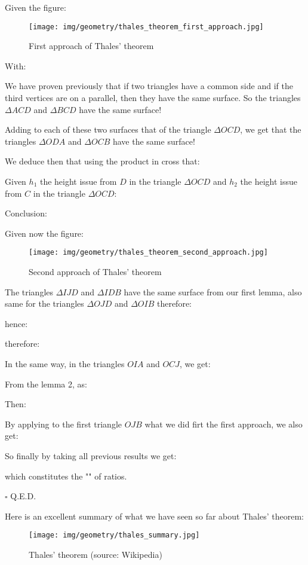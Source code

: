 	\begin{dem}
	Given the figure:
	\begin{figure}[H]
		\centering
		\texttt{[image: img/geometry/thales\_theorem\_first\_approach.jpg]}
		\caption{First approach of Thales' theorem}
	\end{figure}
	With:
	
	We have proven previously that if two triangles have a common side and if the third vertices are on a parallel, then they have the same surface. So the triangles $\Delta ACD$ and $\Delta BCD$ have the same surface!

	Adding to each of these two surfaces that of the triangle $\Delta OCD$, we get that the triangles $\Delta ODA$ and $\Delta OCB$ have the same surface!

	We deduce then that using the product in cross that:
	
	Given $h_1$ the height issue from $D$ in the triangle $\Delta OCD$ and $h_2$ the height issue from $C$ in the triangle $\Delta OCD$:
	
	Conclusion:
	
	Given now the figure:
	\begin{figure}[H]
		\centering
		\texttt{[image: img/geometry/thales\_theorem\_second\_approach.jpg]}
		\caption{Second approach of Thales' theorem}
	\end{figure}
	The triangles $\Delta IJD$ and $\Delta IDB$ have the same surface from our first lemma, also same for the triangles $\Delta OJD$ and $\Delta OIB$ therefore:
	
	hence:
	
	therefore:
	
	In the same way, in the triangles $OIA$ and $OCJ$, we get:
	
	From the lemma 2, as:
	
	Then:
	
	By applying to the first triangle $OJB$ what we did firt the first approach, we also get:
	
	So finally by taking all previous results we get:
	
	which constitutes the "" of ratios.
	\begin{flushright}
		$\square$  Q.E.D.
	\end{flushright}
	\end{dem}
	
	Here is an excellent summary of what we have seen so far about Thales' theorem:
	\begin{figure}[H]
		\centering
		\texttt{[image: img/geometry/thales\_summary.jpg]}
		\caption[Thales' theorem]{Thales' theorem (source: Wikipedia)}
	\end{figure}
	
